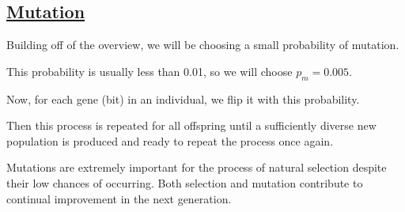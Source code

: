 \newpage
\subsection{\underline{Mutation}}

Building off of the overview, we will be choosing a small probability of 
mutation.
\bi
\item This probability is usually less than 0.01, so we will choose
$p_m = 0.005$.
\item Now, for each gene (bit) in an individual, we flip it with this probability. 
\item Then this process is repeated for all offspring until a sufficiently diverse new population is produced and ready to repeat the process once again.
\item Mutations are extremely important for the process of natural selection despite their low chances of occurring. Both selection and mutation contribute to continual improvement in the next generation.
\ei